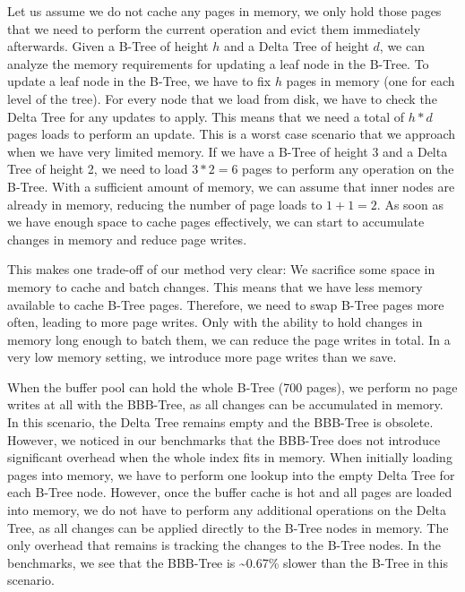 Let us assume we do not cache any pages in memory, we only hold those pages that we need to perform the current operation and evict them immediately afterwards.
Given a B-Tree of height $h$ and a Delta Tree of height $d$, we can analyze the memory requirements for updating a leaf node in the B-Tree.
To update a leaf node in the B-Tree, we have to fix $h$ pages in memory (one for each level of the tree).
For every node that we load from disk, we have to check the Delta Tree for any updates to apply.
This means that we need a total of $h * d$ pages loads to perform an update.
This is a worst case scenario that we approach when we have very limited memory.
If we have a B-Tree of height 3 and a Delta Tree of height 2, we need to load $3 * 2 = 6$ pages to perform any operation on the B-Tree.
With a sufficient amount of memory, we can assume that inner nodes are already in memory, reducing the number of page loads to $1 + 1 = 2$.
As soon as we have enough space to cache pages effectively, we can start to accumulate changes in memory and reduce page writes.

This makes one trade-off of our method very clear:
We sacrifice some space in memory to cache and batch changes.
This means that we have less memory available to cache B-Tree pages.
Therefore, we need to swap B-Tree pages more often, leading to more page writes.
Only with the ability to hold changes in memory long enough to batch them, we can reduce the page writes in total.
In a very low memory setting, we introduce more page writes than we save.

When the buffer pool can hold the whole B-Tree (700 pages), we perform no page writes at all with the BBB-Tree, as all changes can be accumulated in memory.
In this scenario, the Delta Tree remains empty and the BBB-Tree is obsolete.
However, we noticed in our benchmarks that the BBB-Tree does not introduce significant overhead when the whole index fits in memory.
When initially loading pages into memory, we have to perform one lookup into the empty Delta Tree for each B-Tree node.
However, once the buffer cache is hot and all pages are loaded into memory, we do not have to perform any additional operations on the Delta Tree, as all changes can be applied directly to the B-Tree nodes in memory.
The only overhead that remains is tracking the changes to the B-Tree nodes.
In the benchmarks, we see that the BBB-Tree is \textasciitilde0.67\% slower than the B-Tree in this scenario.

